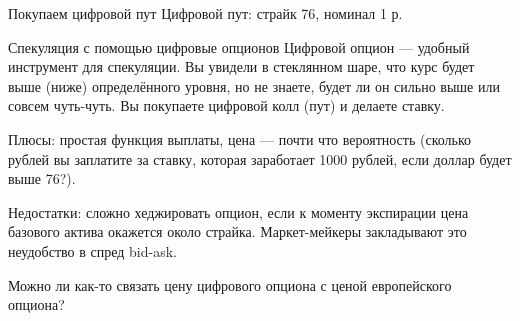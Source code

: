 \documentclass{beamer}
\begin{document}
\begin{frame}{Покупаем цифровой пут}
\justifying
Цифровой пут: страйк 76, номинал 1 р.

\justifying
\centering
\end{frame}



\begin{frame}{Спекуляция с помощью цифровые опционов}
\justify
Цифровой опцион --- удобный инструмент для спекуляции. Вы увидели в стеклянном шаре,
что курс будет выше (ниже) определённого уровня, но не знаете, будет ли он сильно выше
или совсем чуть-чуть. Вы покупаете цифровой колл (пут) и делаете ставку.

\justify
Плюсы: простая функция выплаты, цена --- почти что вероятность (сколько рублей вы 
заплатите за ставку, которая заработает 1000 рублей, если доллар будет выше 76?). 

\justify
Недостатки: сложно хеджировать опцион, если к моменту экспирации цена базового актива окажется около страйка. Маркет-мейкеры закладывают это неудобство в спред bid-ask.

\justify
Можно ли как-то связать цену цифрового опциона с ценой европейского опциона?
\end{frame}
\end{document}
